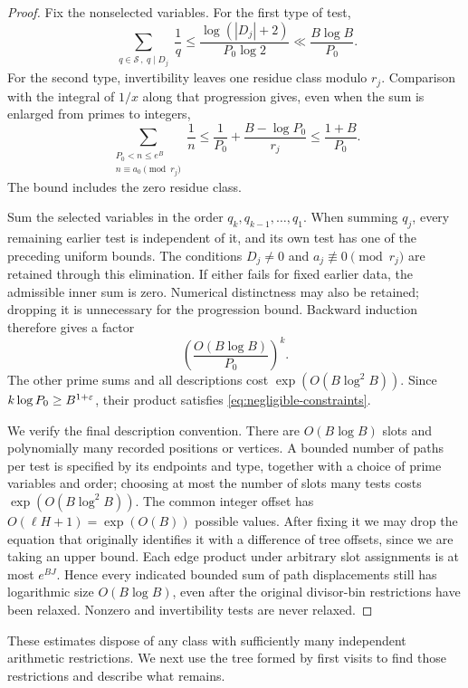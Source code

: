 \begin{proof}
Fix the nonselected variables.  For the first type of test,
\[
 \sum_{\substack{q\in\mathcal S\,,\ q\mid D_j}}\frac1q
 \le \frac{\log(|D_j|+2)}{P_0\log 2}
 \ll \frac{B\log B}{P_0}.
\]
For the second type, invertibility leaves one residue class modulo
$r_j$.  Comparison with the integral of $1/x$ along that progression
gives, even when the sum is enlarged from primes to integers,
\[
 \sum_{\substack{P_0<n\le e^B\\ n\equiv a_0\pmod{r_j}}}\frac1n
 \le \frac1{P_0}+\frac{B-\log P_0}{r_j}
 \le \frac{1+B}{P_0}.
\]
The bound includes the zero residue class.

Sum the selected variables in the order $q_k,q_{k-1},\ldots,q_1$.
When summing $q_j$, every remaining earlier test is independent of
it, and its own test has one of the preceding uniform bounds.  The
conditions $D_j\ne0$ and $a_j\not\equiv0\pmod{r_j}$ are retained
through this elimination.  If either fails for fixed earlier data,
the admissible inner sum is zero.  Numerical distinctness may also
be retained; dropping it is unnecessary for the progression bound.
Backward induction therefore gives a factor
\[
 \left(\frac{O(B\log B)}{P_0}\right)^k.
\]
The other prime sums and all descriptions cost
$\exp(O(B\log^2B))$.  Since
$k\log P_0\ge B^{1+\varepsilon}$, their product satisfies
\eqref{eq:negligible-constraints}.

We verify the final description convention.  There are
$O(B\log B)$ slots and polynomially many recorded positions or
vertices.  A bounded number of paths per test is specified by its
endpoints and type, together with a choice of prime variables and
order; choosing at most the number of slots many tests costs
$\exp(O(B\log^2B))$.  The common integer offset has
$O(\ell H+1)=\exp(O(B))$ possible values.  After fixing it we may
drop the equation that originally identifies it with a difference
of tree offsets, since we are taking an upper bound.  Each edge
product under arbitrary slot assignments is at most $e^{BJ}$.
Hence every indicated bounded sum of path displacements still has
logarithmic size $O(B\log B)$, even after the original divisor-bin
restrictions have been relaxed.  Nonzero and invertibility tests
are never relaxed.
\end{proof}

These estimates dispose of any class with sufficiently many
independent arithmetic restrictions.  We next use the tree formed
by first visits to find those restrictions and describe what remains.
